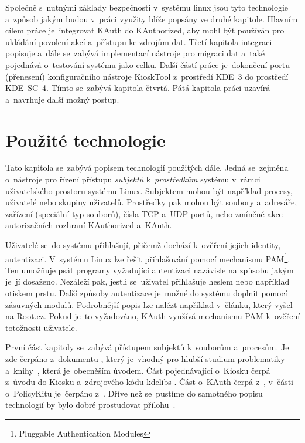 Společně s~nutnými základy bezpečnosti v~systému linux jsou tyto technologie a~způsob jakým budou v~práci využity blíže popsány ve druhé kapitole. Hlavním cílem práce je~integrovat KAuth do KAuthorized, aby mohl být používán pro ukládání povolení akcí a~přístupu ke zdrojům dat. Třetí kapitola integraci popisuje a~dále se~zabývá implementací nástroje pro migraci dat a~také pojednává o~testování systému jako celku. Další částí práce je~dokončení portu (přenesení) konfiguračního nástroje KioskTool z~prostředí KDE~3 do prostředí KDE~SC~4. Tímto se~zabývá kapitola čtvrtá. Pátá kapitola práci uzavírá a~navrhuje další možný postup.

\chapter{Použité technologie}
Tato kapitola se~zabývá popisem technologií použitých dále. Jedná se~zejména o~nástroje pro řízení přístupu \emph{subjektů} k~\emph{prostředkům} systému v~rámci uživatelského prostoru systému Linux. Subjektem mohou být například procesy, uživatelé nebo skupiny uživatelů. Prostředky pak mohou být soubory a~adresáře, zařízení (speciální typ souborů), čísla TCP a~UDP portů, nebo zmíněné akce autorizačních rozhraní KAuthorized a~KAuth.

Uživatelé se~do systému přihlašují, přičemž dochází k~ověření jejich identity, autentizaci. V~systému Linux lze řešit přihlašování pomocí mechanismu PAM\footnote{Pluggable Authentication Modules}. Ten umožňuje psát programy vyžadující autentizaci nazávisle na způsobu jakým je~jí dosaženo. Nezáleží pak, jestli se~uživatel přihlašuje heslem nebo například otiskem prstu. Další způsoby autentizace je~možné do systému doplnit pomocí zásuvných modulů. Podrobnější popis lze nalézt například v~článku, který vyšel na Root.cz\cite{rootpam}. Pokud je~to vyžadováno, KAuth využívá mechanismu PAM k~ověření totožnosti uživatele.

První část kapitoly se~zabývá přístupem subjektů k~souborům a~procesům. Je zde čerpáno z~dokumentu \cite{secureProg}, který je~vhodný pro hlubší studium problematiky a~knihy~\cite{OSP}, která je~obecněším úvodem. Část pojednávající o~Kiosku čerpá z~úvodu do Kiosku \cite{Kioskintro} a~zdrojového kódu kdelibs \cite{codeKdeLibs}. Část o~KAuth čerpá z~\cite{codeKAuth,KAuthusage}, v~části o~PolicyKitu je~čerpáno z~\cite{manpolkit_overview, manpolkit1, manpklocalauth}. Dříve než se~pustíme do samotného popisu technologií by bylo dobré prostudovat přílohu~.

